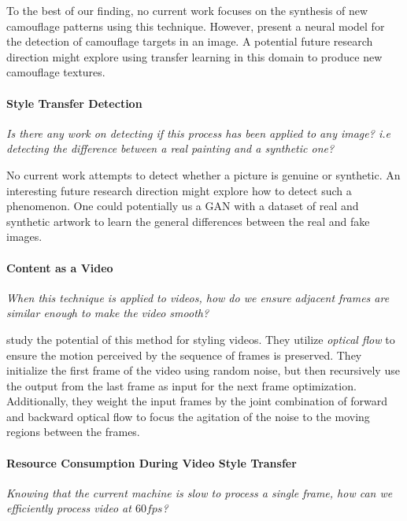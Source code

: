 \documentclass{article}
\begin{document}
To the best of our finding, no current work focuses on the synthesis of new
camouflage patterns using this technique. However, \cite{camo-nn} present a
neural model for the detection of camouflage targets in an image. A potential
future research direction might explore using transfer learning in this domain
to produce new camouflage textures.

\paragraph{Style Transfer Detection} \textit{Is there any work on detecting
if this process has been applied to any image? i.e detecting the difference
between a real painting and a synthetic one?}

No current work attempts to detect whether a picture is genuine or synthetic.
An interesting future research direction might explore how to detect such a
phenomenon. One could potentially us a \ac{GAN} with a dataset of real and
synthetic artwork to learn the general differences between the real and fake
images.

\paragraph{Content as a Video} \textit{When this technique is applied to
videos, how do we ensure adjacent frames are similar enough to make the video
smooth?}

\cite{2016arXiv160408610R} study the potential of this method for styling
videos. They utilize \textit{optical flow} to ensure the motion perceived by
the sequence of frames is preserved. They initialize the first frame of the
video using random noise, but then recursively use the output from the last
frame as input for the next frame optimization. Additionally, they weight the
input frames by the joint combination of forward and backward optical flow to
focus the agitation of the noise to the moving regions between the frames.

\paragraph{Resource Consumption During Video Style Transfer} \textit{Knowing
that the current machine is slow to process a single frame, how can we
efficiently process video at $60fps$?}
\end{document}
